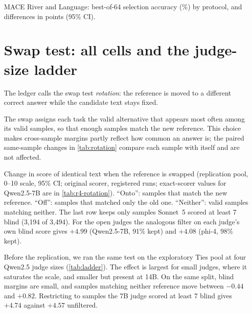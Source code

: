 \begin{table}[htbp]
\centering
\caption{\textsc{MACE} River and Language: best-of-64 selection accuracy (\%) by protocol, and differences in points (95\% CI).\pre}
\label{tab:mace-accuracy}
\footnotesize
\setlength{\tabcolsep}{3pt}
\begin{adjustbox}{max width=\linewidth}\end{adjustbox}

\end{table}

\FloatBarrier
\section{Swap test: all cells and the judge-size ladder}
\label{app:rotation}

The ledger calls the swap test \emph{rot\-ation}: the reference is moved to a different correct answer while the candidate text stays fixed.

The swap assigns each task the valid alternative that appears most often among its valid samples, so that enough samples match the new reference. This choice makes cross-sample margins partly reflect how common an answer is; the paired same-sample changes in \cref{tab:rotation} compare each sample with itself and are not affected.

\begin{table}[htbp]
\centering
\caption{Change in score of identical text when the reference is swapped (replication pool, 0--10 scale, 95\% CI; original scorer, registered runs; exact-scorer values for Qwen2.5-7B are in \cref{tab:r4-rotation}).\pre{} ``Onto'': samples that match the new reference. ``Off'': samples that matched only the old one. ``Neither'': valid samples matching neither. The last row keeps only samples Sonnet~5 scored at least 7 blind (3,194 of 3,494). For the open judges the analogous filter on each judge's own blind score gives $+4.99$  (Qwen2.5-7B, 91\% kept) and $+4.08$ (phi-4, 98\% kept).\ph}
\label{tab:rotation}
\footnotesize
\setlength{\tabcolsep}{3pt}
\begin{adjustbox}{max width=\linewidth}\end{adjustbox}

\end{table}

Before the replication, we ran the same test on the exploratory Ties pool at four Qwen2.5 judge sizes (\cref{tab:ladder}). The effect is largest for small judges, where it saturates the scale, and smaller but present at 14B. On the same split, blind margins are small, and samples matching neither reference move between $-0.44$ and $+0.82$. Restricting to samples the 7B judge scored at least 7 blind gives $+4.74$  against $+4.57$ unfiltered.

